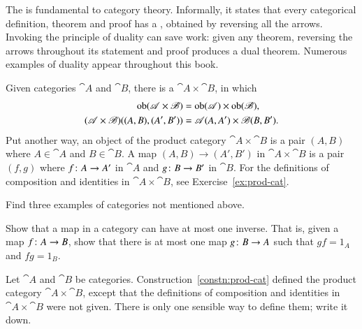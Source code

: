 \begin{remark}
\label{rmk:principle-duality}
The %
%
%
is fundamental to category theory.  Informally, it states that every
categorical definition, theorem and proof has a , obtained by
reversing all the arrows.  Invoking the principle of duality can save work:
given any theorem, reversing the arrows throughout its statement and proof
produces a dual theorem.  Numerous examples of duality appear throughout
this book.
\end{remark}

\begin{constn}
\label{constn:prod-cat}
Given categories $\cat{A}$ and $\cat{B}$, there is a  $\cat{A} \times \cat{B}$,%
%
%
 in which
%
\begin{align*}
\operatorname{ob}(\mathscr{A} \times \mathscr{B})     &
=
\operatorname{ob}(\mathscr{A}) \times \operatorname{ob}(\mathscr{B}),\\
(\mathscr{A} \times \mathscr{B})((A, B), (A', B'))      &
=
\mathscr{A}(A, A') \times \mathscr{B}(B, B').
\end{align*}
%
Put another way, an object of the product category $\cat{A} \times \cat{B}$
is a pair $(A, B)$ where $A \in \cat{A}$ and $B \in \cat{B}$.  A map $(A,
B) \to (A', B')$ in $\cat{A} \times \cat{B}$ is a pair $(f, g)$ where
$f\from A \to A'$ in $\cat{A}$ and $g\from B \to B'$ in $\cat{B}$.  For the
definitions of composition and identities in $\cat{A} \times \cat{B}$, see
Exercise~\ref{ex:prod-cat}.
\end{constn}


\exs


\begin{question}
Find three examples of categories not mentioned above.
\end{question}


\begin{question}
\label{ex:unique-inverse}
Show that a map in a category can have at most one inverse.  That is, given
a map $f\from A \to B$, show that there is at most one map $g\from B \to A$
such that $gf = 1_A$ and $fg = 1_B$.
\end{question}


\begin{question}
\label{ex:prod-cat}
Let $\cat{A}$ and $\cat{B}$ be categories.
Construction~\ref{constn:prod-cat} defined the product category $\cat{A}
\times \cat{B}$, except that the definitions of composition and identities
in $\cat{A} \times \cat{B}$ were not given.  There is only one sensible way
to define them; write it down.
\end{question}


